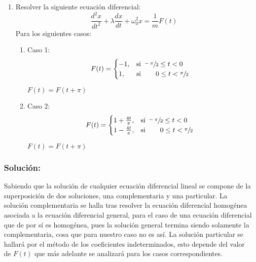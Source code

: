 \begin{multicols}{2}
\begin{enumerate}[leftmargin=15pt]
    \item Resolver la siguiente ecuación diferencial:
    \begin{equation*}
        \frac{d^{2}x}{dt^{2}} + \lambda \frac{dx}{dt} + \omega_{0}^{2}x = \frac{1}{m} F(t)
    \end{equation*}
    Para los siguientes casos:
    \begin{enumerate}
        \item Caso 1:
        \begin{equation*}
            F(t) =
            \begin{cases}
            -1,&\text{si } \sfrac{-\pi}{2} \leq t < 0\\
            1,&\text{si } \hspace{18pt} 0 \leq t < \sfrac{\pi}{2}
            \end{cases}
        \end{equation*}
        \begin{center}$F(t)=F(t+\pi)$\end{center}
        \item Caso 2:
        \begin{equation*}
            F(t) =
            \begin{cases}
            1 + \frac{4t}{\pi},&\text{si } \sfrac{-\pi}{2} \leq t < 0\\
            1 - \frac{4t}{\pi},&\text{si } \hspace{18pt} 0 \leq t < \sfrac{\pi}{2}
            \end{cases}
        \end{equation*}
        \begin{center}$F(t)=F(t+\pi)$\end{center}
    \end{enumerate}
\end{enumerate}

\subsubsection*{Solución:}

Sabiendo que la solución de cualquier ecuación diferencial lineal se compone de la superposición de dos soluciones, una complementaria y una particular. La solución complementaria se halla tras resolver la ecuación diferencial homogénea asociada a la ecuación diferencial general, para el caso de una ecuación diferencial que de por sí es homogénea, pues la solución general termina siendo solamente la complementaria, cosa que para nuestro caso no es así. La solución particular se hallará por el método de los coeficientes indeterminados, esto depende del valor de $F(t)$ que más adelante se analizará para los casos correspondientes.


\end{multicols}
